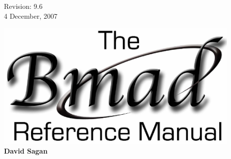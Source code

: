 \thispagestyle{empty}

\begin{flushright}
\large
  Revision: 9.6 \\
  4 December, 2007 \\
\end{flushright}

\vfill

{
\begin{center}
\includegraphics[width=12cm]{bmad-ref-manual.eps} \\
\vskip 0.3in
\huge\bf David Sagan
\end{center}
}

\vfill
\break

